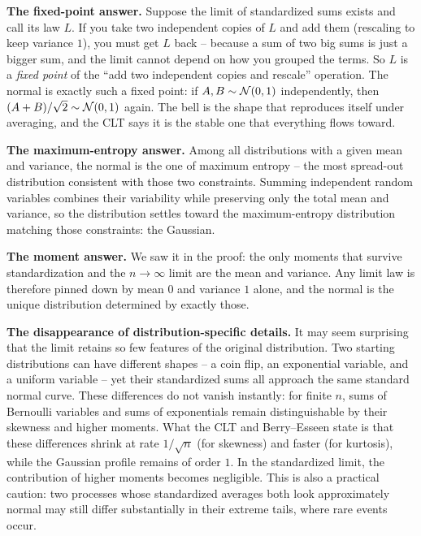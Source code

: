 \textbf{The fixed-point answer.} Suppose the limit of standardized sums exists and call
its law $L$. If you take two independent copies of $L$ and add them (rescaling to keep
variance $1$), you must get $L$ back -- because a sum of two big sums is just a bigger
sum, and the limit cannot depend on how you grouped the terms. So $L$ is a
\emph{fixed point} of the ``add two independent copies and rescale'' operation. The
normal is exactly such a fixed point: if $A, B \sim \mathcal{N}(0,1)$ independently, then
$(A+B)/\sqrt 2 \sim \mathcal{N}(0,1)$ again. The bell is the shape that reproduces itself
under averaging, and the CLT says it is the stable one that everything flows toward.

\textbf{The maximum-entropy answer.} Among all distributions with a given mean and
variance, the normal is the one of maximum entropy -- the most spread-out distribution
consistent with those two constraints. Summing independent random variables combines
their variability while preserving only the total mean and variance, so the distribution
settles toward the maximum-entropy distribution matching those constraints: the Gaussian.

\textbf{The moment answer.} We saw it in the proof: the only moments that survive
standardization and the $n \to \infty$ limit are the mean and variance. Any limit law is
therefore pinned down by mean $0$ and variance $1$ alone, and the normal is the unique
distribution determined by exactly those.

\begin{paradoxbox}
\textbf{The disappearance of distribution-specific details.} It may seem surprising that the
limit retains so few features of the original distribution. Two starting distributions can have
different shapes -- a coin flip, an exponential variable, and a uniform variable -- yet
their standardized sums all approach the same standard normal curve.
These differences do not vanish instantly: for finite $n$, sums of Bernoulli variables and sums of
exponentials remain distinguishable by their skewness and higher moments.
What the CLT and Berry--Esseen state is that these differences shrink at rate $1/\sqrt n$
(for skewness) and faster (for kurtosis), while the Gaussian profile remains of order $1$.
In the standardized limit, the contribution of higher moments becomes negligible.
This is also a practical caution: two processes whose standardized averages both look approximately normal
may still differ substantially in their extreme tails, where rare events occur.
\end{paradoxbox}

